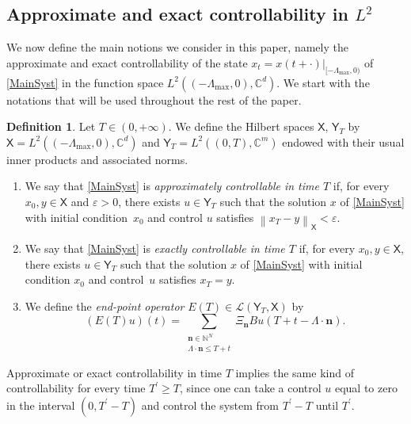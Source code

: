 \documentclass[10pt]{article}
\newcommand{\bn}{\boldsymbol{n}}
\theoremstyle{plain}
\theoremstyle{definition}
\newtheorem{defi}[theo]{Definition}
\newcommand{\norm}[1]{\left\lVert #1\right\lVert}
\numberwithin{equation}{section}\numberwithin{figure}{section}\emergencystretch=3em
\begin{document}
\subsection{Approximate and exact controllability in \texorpdfstring{$L^2$}{L2}}
\label{SecControlL2}

We now define the main \hbox{notions} we consider in this paper, namely the approximate and exact controllability of the state $x_t = \left.x(t + \cdot)\right|_{[-\Lambda_{\max}, 0)}$ of \eqref{MainSyst} in the function space $L^2((-\Lambda_{\max}, 0), \mathbb C^d)$. We start with the notations that will be used throughout the rest of the paper.

\begin{defi}
\label{DefiContrExactApprox}
Let $T \in (0, +\infty)$. We define the Hilbert spaces $\mathsf X$, $\mathsf Y_T$ by $\mathsf X = L^2((-\Lambda_{\max}, 0), \mathbb C^d)$ and $\mathsf Y_T = L^2((0, T), \mathbb C^m)$ endowed with their usual inner products and associated norms.
\begin{enumerate}
\item We say that \eqref{MainSyst} is \emph{approximately controllable in time $T$} if, for every $x_0, y \in \mathsf X$ and $\varepsilon > 0$, there exists $u \in \mathsf Y_T$ such that the solution $x$ of \eqref{MainSyst} with initial condition~$x_0$ and control $u$ satisfies $\norm{x_T - y}_{\mathsf X} < \varepsilon$.

\item We say that \eqref{MainSyst} is \emph{exactly controllable in time $T$} if, for every $x_0, y \in \mathsf X$, there exists $u \in \mathsf Y_T$ such that the solution $x$ of \eqref{MainSyst} with initial condition $x_0$ and control~$u$ satisfies $x_T = y$.

\item We define the \emph{end-point operator} $E(T) \in \mathcal L(\mathsf Y_T, \mathsf X)$ by\vspace*{-3pt}
\begin{equation}
\label{EqDefET}
(E(T)u)(t) = \sum_{\substack{\bn \in \mathbb N^N \\ \Lambda \cdot \bn \leq T + t}} \Xi_{\bn} B u(T + t - \Lambda \cdot \bn).
\end{equation}
\end{enumerate}
\end{defi}

Approximate or exact controllability in time $T$ implies the same kind of controllability for every time $T^\prime \geq T$, since one can take a control $u$ equal to zero in the interval $(0, T^\prime - T)$ and control the system from $T^\prime - T$ until $T^\prime$.
\end{document}
